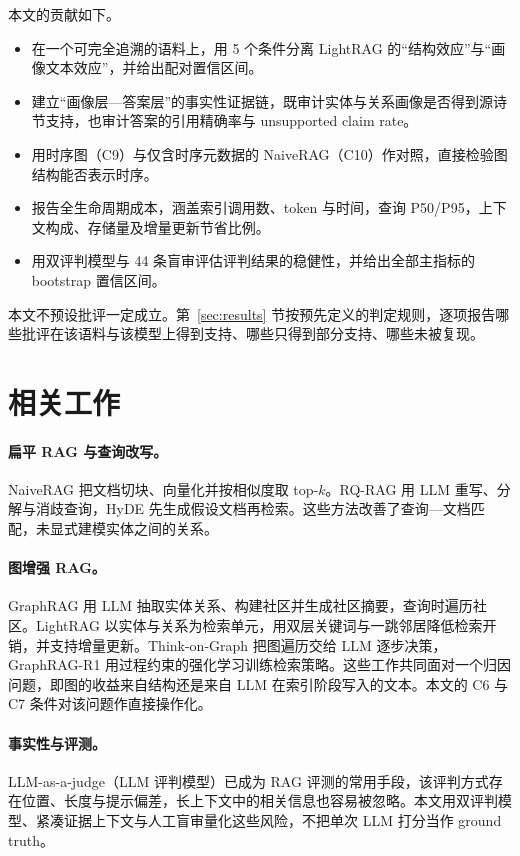 \documentclass[11pt,a4paper]{ctexart}
\begin{document}
本文的贡献如下。
\begin{itemize}
\item 在一个可完全追溯的语料上，用 5 个条件分离 LightRAG 的“结构效应”与“画像文本效应”，并给出配对置信区间。
\item 建立“画像层—答案层”的事实性证据链，既审计实体与关系画像是否得到源诗节支持，也审计答案的引用精确率与 unsupported claim rate。
\item 用时序图（C9）与仅含时序元数据的 NaiveRAG（C10）作对照，直接检验图结构能否表示时序。
\item 报告全生命周期成本，涵盖索引调用数、token 与时间，查询 P50/P95，上下文构成、存储量及增量更新节省比例。
\item 用双评判模型与 44 条盲审评估评判结果的稳健性，并给出全部主指标的 bootstrap 置信区间。
\end{itemize}

本文不预设批评一定成立。第~\ref{sec:results} 节按预先定义的判定规则，逐项报告哪些批评在该语料与该模型上得到支持、哪些只得到部分支持、哪些未被复现。

\section{相关工作}

\paragraph{扁平 RAG 与查询改写。}
NaiveRAG 把文档切块、向量化并按相似度取 top-$k$\citep{gao2023survey}。RQ-RAG 用 LLM 重写、分解与消歧查询\citep{chan2024rqrag}，HyDE 先生成假设文档再检索\citep{gao2022hyde}。这些方法改善了查询—文档匹配，未显式建模实体之间的关系。

\paragraph{图增强 RAG。}
GraphRAG 用 LLM 抽取实体关系、构建社区并生成社区摘要，查询时遍历社区\citep{edge2024graphrag}。LightRAG 以实体与关系为检索单元，用双层关键词与一跳邻居降低检索开销，并支持增量更新\citep{guo2024lightrag}。Think-on-Graph 把图遍历交给 LLM 逐步决策\citep{sun2023thinkongraph}，GraphRAG-R1 用过程约束的强化学习训练检索策略\citep{yu2025graphragr1}。这些工作共同面对一个归因问题，即图的收益来自结构还是来自 LLM 在索引阶段写入的文本。本文的 C6 与 C7 条件对该问题作直接操作化。

\paragraph{事实性与评测。}
LLM-as-a-judge（LLM 评判模型）已成为 RAG 评测的常用手段\citep{zheng2023judge}，该评判方式存在位置、长度与提示偏差，长上下文中的相关信息也容易被忽略\citep{liu2023lost}。本文用双评判模型、紧凑证据上下文与人工盲审量化这些风险，不把单次 LLM 打分当作 ground truth。
\end{document}
